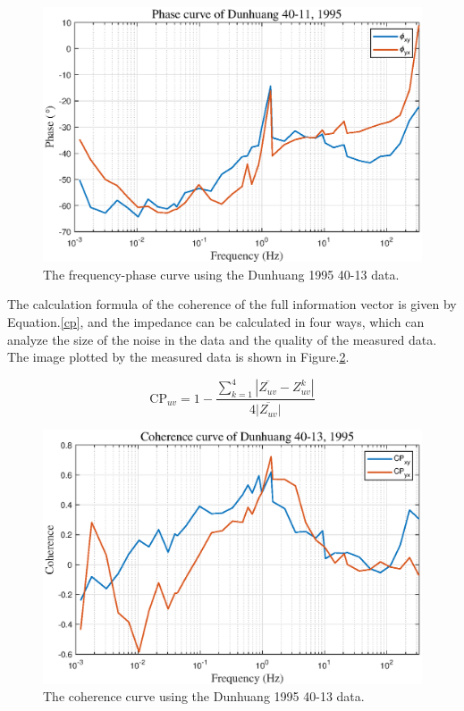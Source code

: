 \documentclass[9pt,a4paper,twoside]{rho-class/rho}
\begin{document}
\begin{figure}[H]
    \centering
    \includegraphics[width=0.95\columnwidth]{figures/ph40-13.eps}
    \caption{The frequency-phase curve using the Dunhuang 1995 40-13 data.}
    \label{fig:ph40-13}
\end{figure}

The calculation formula of the coherence of the full information vector is given by Equation.\eqref{cp}, and the impedance can be calculated in four ways, which can analyze the size of the noise in the data and the quality of the measured data. The image plotted by the measured data is shown in Figure.\ref{fig:cp40-13}.

\begin{equation}
    \label{cp}
    \mathrm{CP}_{uv} = 1-\dfrac{\sum^4_{k=1}|\overline{Z_{uv}}-Z_{uv}^k|}{4\overline{|Z_{uv}|}}
\end{equation}

\begin{figure}[H]
    \centering
    \includegraphics[width=0.95\columnwidth]{figures/cp40-13.eps}
    \caption{The coherence curve using the Dunhuang 1995 40-13 data.}
    \label{fig:cp40-13}
\end{figure}
\end{document}
